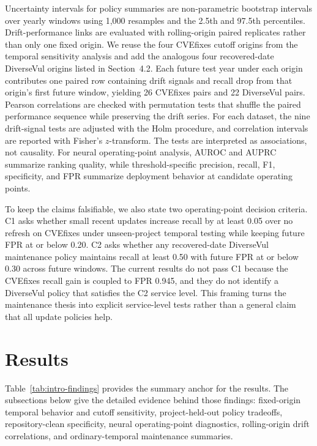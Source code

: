 \documentclass[a4paper,fleqn]{cas-dc}
\begin{document}
Uncertainty intervals for policy summaries are non-parametric bootstrap
intervals over yearly windows using 1,000 resamples and the 2.5th and 97.5th
percentiles. Drift-performance links are evaluated with rolling-origin paired
replicates rather than only one fixed origin. We reuse the four CVEfixes cutoff
origins from the temporal sensitivity analysis and add the analogous four
recovered-date DiverseVul origins listed in Section~4.2. Each future test year
under each origin contributes one paired row containing drift signals and recall
drop from that origin's first future window, yielding 26 CVEfixes pairs and 22
DiverseVul pairs. Pearson correlations are checked with permutation tests that
shuffle the paired performance sequence while preserving the drift series. For
each dataset, the nine drift-signal tests are adjusted with the Holm procedure,
and correlation intervals are reported with Fisher's $z$-transform. The tests
are interpreted as associations, not causality. For neural
operating-point analysis, AUROC and AUPRC summarize ranking quality, while
threshold-specific precision, recall, F1, specificity, and FPR summarize
deployment behavior at candidate operating points.

To keep the claims falsifiable, we also state two operating-point decision
criteria. C1 asks whether small recent updates increase recall by at least 0.05
over no refresh on CVEfixes under unseen-project temporal testing while keeping
future FPR at or below 0.20. C2 asks whether any recovered-date DiverseVul
maintenance policy maintains recall at least 0.50 with future FPR at or below
0.30 across future windows. The current results do not pass C1 because the
CVEfixes recall gain is coupled to FPR 0.945, and they do not identify a
DiverseVul policy that satisfies the C2 service level. This framing turns the
maintenance thesis into explicit service-level tests rather than a general claim
that all update policies help.

\section{Results}

Table~\ref{tab:intro-findings} provides the summary anchor for the results.
The subsections below give the detailed evidence behind those findings:
fixed-origin temporal
behavior and cutoff sensitivity, project-held-out policy tradeoffs,
repository-clean specificity, neural operating-point diagnostics, rolling-origin
drift correlations, and ordinary-temporal maintenance summaries.
\end{document}
